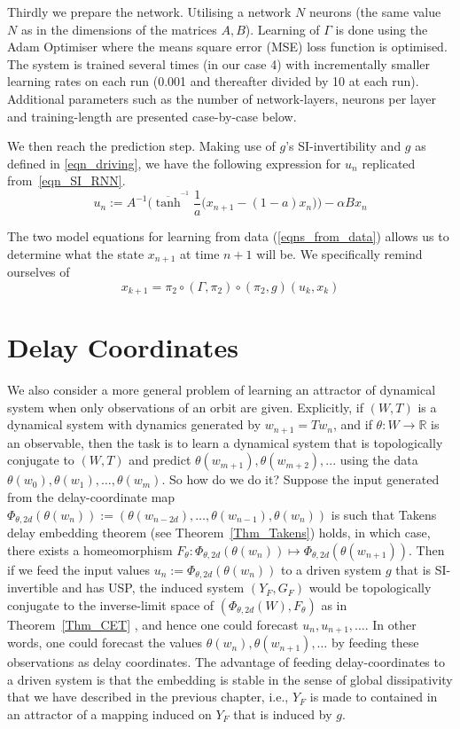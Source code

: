 \documentclass[a4paper,12pt,twoside]{report}
\begin{document}
Thirdly we prepare the network. Utilising a network $N$ neurons (the same value $N$ as in the dimensions of the matrices $A,B$). Learning of $\Gamma$ is done using the Adam Optimiser where the means square error (MSE) loss function is optimised. The system is trained several times (in our case 4) with incrementally smaller learning rates on each run (0.001 and thereafter divided by 10 at each run). 
Additional parameters such as the number of network-layers, neurons per layer and training-length are presented case-by-case below.

We then reach the prediction step. Making use of $g$'s SI-invertibility and $g$ as defined in \eqref{eqn_driving}, we have the following expression for $u_n$ replicated from~\eqref{eqn_SI_RNN}.
\begin{equation*}
  u_n := A^{-1}\bigg(\overline{\tanh}^{^{-1}}\frac{1}{a}\Big(x_{n+1}-(1-a)x_n\Big) \bigg) - \alpha B x_n
\end{equation*}
    
The two model equations for learning from data (\eqref{eqns_from_data}) allows us to determine what the state $x_{n+1}$ at time $n+1$ will be. 
We specifically remind ourselves of \[x_{k+1}=\pi_2 \circ (\Gamma, \pi_2) \circ (\pi_2,g) (u_k,x_k)\]

\section{Delay Coordinates}

We also consider a more general problem of learning an attractor of dynamical system when only observations of an orbit are given. Explicitly, if $(W,T)$ is a dynamical system with dynamics generated by $w_{n+1}=Tw_n$, and if $\theta:W \to \mathbb{R}$ is an observable, then the task is to learn a dynamical system that is topologically conjugate to $(W,T)$ and predict $\theta(w_{m+1}),\theta(w_{m+2}),...$ using the data $\theta(w_{0}),\theta(w_{1}),\ldots,\theta(w_{m})$.  So how do we do it?
Suppose the input generated from the delay-coordinate map $\Phi_{\theta,2d}(\theta(w_{n})) := (\theta(w_{n-2d}),\ldots,\theta(w_{n-1}),\theta(w_{n}))$ is such that Takens delay embedding theorem (see Theorem~\ref{Thm_Takens}) holds, in which case, there exists a homeomorphism  $F_\theta: \Phi_{\theta,2d}(\theta(w_{n})) \mapsto \Phi_{\theta,2d}(\theta(w_{n+1}))$. Then if we feed  the input values $u_n := \Phi_{\theta,2d}(\theta(w_{n}))$ to a driven system $g$ that is SI-invertible and has USP, the induced system $(Y_F,G_F)$ would be topologically conjugate to the inverse-limit space of
$(\Phi_{\theta,2d}(W), F_\theta)$ as in Theorem~\ref{Thm_CET} , and hence one could forecast $u_n,u_{n+1},\ldots$. In other words, one could forecast  the values $\theta(w_n), \theta(w_{n+1}),\ldots$ by feeding these observations as delay coordinates. The advantage of feeding delay-coordinates to a driven system is that the embedding is stable in the sense of global dissipativity that we have described in the previous chapter, i.e., $Y_F$ is made to contained in an attractor of a mapping induced on $Y_F$ that is induced by $g$. 
\end{document}
